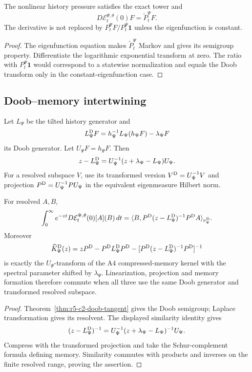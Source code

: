 \begin{theorem}
\label{thm:r5-c2-doob-tangent}
The nonlinear history pressure satisfies the exact tower and
\[
 D\mathcal E_t^{\Psi,\theta}(0)F=\widetilde P_t^\Psi F.
\]
The derivative is not replaced by
\(P_t^\Psi F/P_t^\Psi\mathbf1\) unless the eigenfunction is constant.
\end{theorem}

\begin{proof}
The eigenfunction equation makes \(\widetilde P_t^\Psi\) Markov and gives its
semigroup property.  Differentiate the logarithmic exponential transform at
zero.  The ratio with \(P_t^\Psi\mathbf1\) would correspond to a statewise
normalization and equals the Doob transform only in the constant-eigenfunction
case.
\end{proof}

\subsection{Doob--memory intertwining}

Let \(L_\Psi\) be the tilted history generator and
\[
 L_\Psi^{\rm D}F=h_\Psi^{-1}L_\Psi(h_\Psi F)-\lambda_\Psi F
\]
its Doob generator.  Let
\(U_\Psi F=h_\Psi F\).  Then
\[
 z-L_\Psi^{\rm D}
 =U_\Psi^{-1}(z+\lambda_\Psi-L_\Psi)U_\Psi.
\]
For a resolved subspace \(V\), use its transformed version
\(V^{\rm D}=U_\Psi^{-1}V\) and projection
\(P^{\rm D}=U_\Psi^{-1}PU_\Psi\) in the equivalent eigenmeasure Hilbert
norm.

\begin{theorem}
\label{thm:r5-c2-memory}
For resolved \(A,B\),
\[
 \int_0^\infty e^{-zt}
 D\mathcal E_t^{\Psi,\theta}(0)[A](B)\,dt
 =\langle B,
 P^{\rm D}(z-L_\Psi^{\rm D})^{-1}P^{\rm D}A\rangle_{\nu_\Psi^{\rm D}}.
\]
Moreover
\[
 \widehat K_\Psi^{\rm D}(z)=
 zP^{\rm D}-P^{\rm D}L_\Psi^{\rm D}P^{\rm D}
 -[P^{\rm D}(z-L_\Psi^{\rm D})^{-1}P^{\rm D}]^{-1}
\]
is exactly the \(U_\Psi\)-transform of the A4 compressed-memory kernel with
the spectral parameter shifted by \(\lambda_\Psi\).  Linearization,
projection and memory formation therefore commute when all three use the same
Doob generator and transformed resolved subspace.
\end{theorem}

\begin{proof}
Theorem~\ref{thm:r5-c2-doob-tangent} gives the Doob semigroup; Laplace
transformation gives its resolvent.  The displayed similarity identity gives
\[
 (z-L_\Psi^{\rm D})^{-1}
 =U_\Psi^{-1}(z+\lambda_\Psi-L_\Psi)^{-1}U_\Psi.
\]
Compress with the transformed projection and take the Schur-complement
formula defining memory.  Similarity commutes with products and inverses on
the finite resolved range, proving the assertion.
\end{proof}

